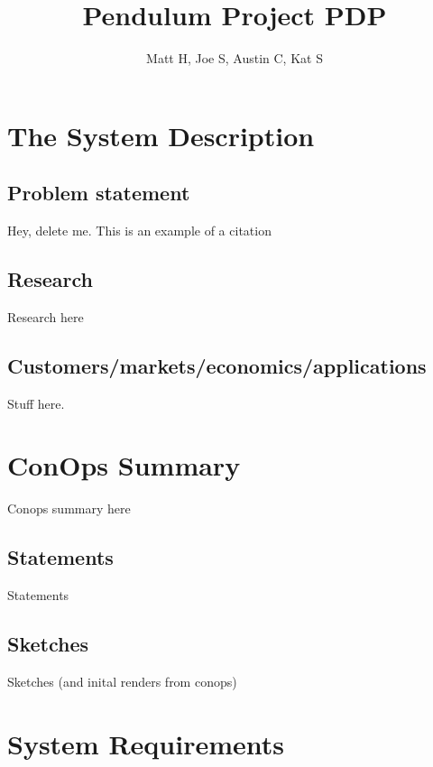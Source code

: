 \documentclass[a4paper,10pt]{article}
\title{Pendulum Project PDP}
\author{Matt H, Joe S, Austin C, Kat S}
\begin{document}
\maketitle

\tableofcontents
\pagebreak


\section{The System Description}
\subsection{Problem statement}

Hey, delete me. This is an example of a citation \cite{marcin_wisniewski_pid_2015}

\subsection{Research} %

Research here

\subsection{Customers/markets/economics/applications}
Stuff here.

\section{ConOps Summary}

Conops summary here

\subsection{Statements} %

Statements

\subsection{Sketches} %

Sketches (and inital renders from conops)

\section{System Requirements} %
\end{document}
